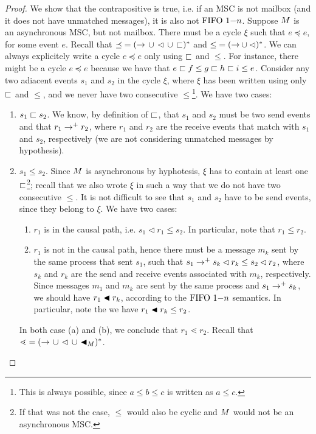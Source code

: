 \begin{proof}
We show that the contrapositive is true, i.e. if an MSC is not mailbox (and it does not have unmatched messages), it is also not $\text{FIFO } 1\mathsf{-}n$. Suppose $M$ is an asynchronous MSC, but not mailbox. There must be a cycle $\xi$ such that  $e \preceq e$, for some event $e$. Recall that ${\preceq} = ({\to} \,\cup\, {\lhd} \,\cup\, {\sqsubset})^\ast$ and ${\le} = ({\to} \cup {\lhd})^\ast$. We can always explicitely write a cycle $e \preceq e$ only using $\sqsubset$ and $\le$. For instance, there might be a cycle $e \preceq e$ because we have that $e \sqsubset f \le g \sqsubset h \sqsubset i \le e$. Consider any two adiacent events $s_1$ and $s_2$ in the cycle $\xi$, where $\xi$ has been written using only $\sqsubset$ and $\le$, and we never have two consecutive $\le$\footnote{This is always possible, since $a \le b \le c$ is written as $a \le c$.}. We have two cases:
\begin{enumerate}
	\item $s_1 \sqsubset s_2$. We know, by definition of $\sqsubset$, that $s_1$ and $s_2$ must be two send events and that $r_1 \to^+ r_2$, where $r_1$ and $r_2$ are the receive events that match with $s_1$ and $s_2$, respectively (we are not considering unmatched messages by hypothesis).
	\item $s_1 \le s_2$. Since $M$ is asynchronous by hyphotesis, $\xi$ has to contain at least one $\sqsubset$\footnote{If that was not the case, $\le$ would also be cyclic and $M$ would not be an asynchronous MSC.}; recall that we also wrote $\xi$ in such a way that we do not have two consecutive $\le$. It is not difficult to see that $s_1$ and $s_2$ have to be send events, since they belong to $\xi$. We have two cases:
	\begin{enumerate}
		\item $r_1$ is in the causal path, i.e. $s_1 \lhd r_1 \le s_2$. In particular, note that $r_1 \le r_2$.
		\item $r_1$ is not in the causal path, hence there must be a message $m_k$ sent by the same process that sent $s_1$, such that $s_1 \to^+ s_k \lhd r_k \le s_2 \lhd r_2$, where $s_k$ and $r_k$ are the send and receive events associated with $m_k$, respectively. Since messages $m_1$ and $m_k$ are sent by the same process and $s_1 \to^+ s_k$, we should have $r_1 \blacktriangleleft r_k$, according to the $\text{FIFO } 1\mathsf{-}n$ semantics. In particular, note the we have $r_1 \blacktriangleleft r_k \le r_2$.
	\end{enumerate}
	In both case (a) and (b), we conclude that $r_1 \lessdot r_2$. Recall that ${\lessdot} = ({\to} \,\cup\, {\lhd} \,\cup\, {\blacktriangleleft_M})^\ast$.

\end{enumerate}
\end{proof}
